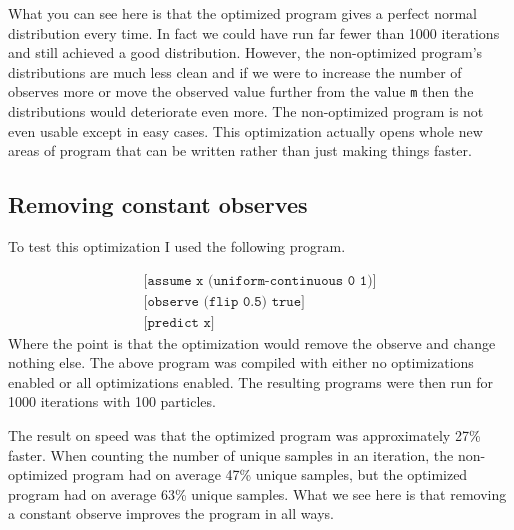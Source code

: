 \documentclass[a4paper]{article}
\begin{document}
What you can see here is that the optimized program gives a perfect normal distribution every time. In fact we could have run far fewer than 1000 iterations and still achieved a good distribution. However, the non-optimized program's distributions are much less clean and if we were to increase the number of observes more or move the observed value further from the value \texttt{m} then the distributions would deteriorate even more. The non-optimized program is not even usable except in easy cases. This optimization actually opens whole new areas of program that can be written rather than just making things faster.




\subsection{Removing constant observes}

To test this optimization I used the following program.

\[
	\begin{array}{l}
		\texttt{[assume x (uniform-continuous 0 1)]} \\
		\texttt{[observe (flip 0.5) true]} \\
		\texttt{[predict x]}
	\end{array}
\]
Where the point is that the optimization would remove the observe and change nothing else. The above program was compiled with either no optimizations enabled or all optimizations enabled. The resulting programs were then run for 1000 iterations with 100 particles.

The result on speed was that the optimized program was approximately 27\% faster. When counting the number of unique samples in an iteration, the non-optimized program had on average 47\% unique samples, but the optimized program had on average 63\% unique samples. What we see here is that removing a constant observe improves the program in all ways.



\end{document}
